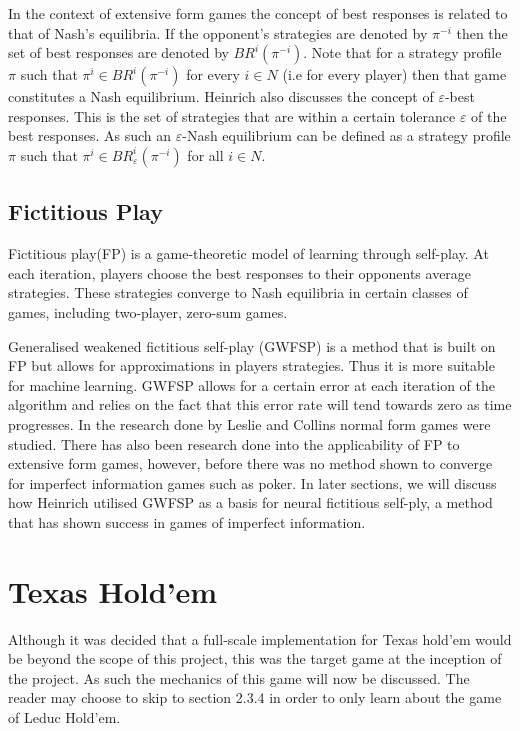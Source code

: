 In the context of extensive form games the concept of best responses is related to that of Nash's equilibria.
If the opponent's strategies are denoted by $\pi^{-i}$ then the set of best responses are denoted by
$BR^i(\pi^{-i})$.
Note that for a strategy profile $\pi$ such that $\pi^i\in BR^i(\pi^{-i})$ for every $i\in N$ (i.e
for every player) then that game constitutes a Nash equilibrium\citep{heinrich2017reinforcement}.
Heinrich also discusses the concept of $\varepsilon$-best responses.
This is the set of strategies that are within a certain tolerance $\varepsilon$ of the best responses.
As such an $\varepsilon$-Nash equilibrium can be defined as a strategy profile $\pi$ such that
$\pi^i \in BR^i_\varepsilon (\pi^{-i})$ for all $i\in N$.

\subsection{Fictitious Play}\label{subsec:fictitiousPlay}
Fictitious play(FP) is a game-theoretic model of learning through self-play.
At each iteration, players choose the best responses to their opponents average
strategies\citep{heinrich2017reinforcement}.
These strategies converge to Nash equilibria in certain classes of games, including two-player, zero-sum games.

Generalised weakened fictitious self-play (GWFSP) is a method that is built on FP but allows for approximations
in players strategies\citep{leslie2006generalised}.
Thus it is more suitable for machine learning.
GWFSP allows for a certain error at each iteration of the algorithm and relies on the fact that this
error rate will tend towards zero as time progresses.
In the research done by Leslie and Collins normal form games were studied.
There has also been research done into the applicability of FP to extensive form games, however,
before\citep{heinrich2016deep} there was no method shown to converge for imperfect information games such as poker.
In later sections, we will discuss how Heinrich utilised GWFSP as a basis for neural fictitious self-ply,
a method that has shown success in games of imperfect information.

\section{Texas Hold'em}\label{sec:thIntro}
Although it was decided that a full-scale implementation for Texas hold'em would be beyond the
scope of this project, this was the target game at the inception of the project.
As such the mechanics of this game will now be discussed.
The reader may choose to skip to section 2.3.4 in order to only learn about the game of Leduc Hold'em.

